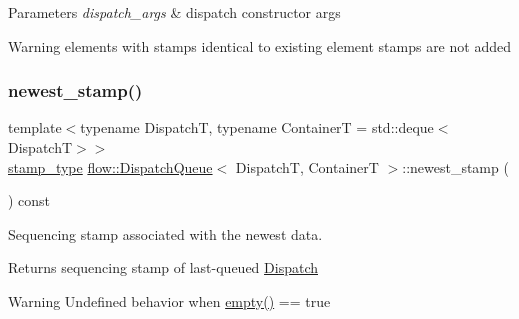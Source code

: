 \begin{DoxyParams}{Parameters}
{\em dispatch\+\_\+args} & dispatch constructor args\\
\hline
\end{DoxyParams}
\begin{DoxyWarning}{Warning}
elements with stamps identical to existing element stamps are not added 
\end{DoxyWarning}
\mbox{\label{classflow_1_1_dispatch_queue_a5ced281bc5c221a79bf88a6169429252}} 
\subsubsection{\texorpdfstring{newest\+\_\+stamp()}{newest\_stamp()}}
{\footnotesize\ttfamily template$<$typename DispatchT, typename ContainerT = std\+::deque$<$\+Dispatch\+T$>$$>$ \\
\hyperlink{classflow_1_1_dispatch_queue_a7908f3d78b7f1767462244b94434d748}{stamp\+\_\+type} \hyperlink{classflow_1_1_dispatch_queue}{flow\+::\+Dispatch\+Queue}$<$ DispatchT, ContainerT $>$\+::newest\+\_\+stamp (\begin{DoxyParamCaption}{ }\end{DoxyParamCaption}) const\hspace{0.3cm}{\ttfamily [inline]}}



Sequencing stamp associated with the newest data. 

\begin{DoxyReturn}{Returns}
sequencing stamp of last-\/queued \hyperlink{classflow_1_1_dispatch}{Dispatch}
\end{DoxyReturn}
\begin{DoxyWarning}{Warning}
Undefined behavior when {\ttfamily \hyperlink{classflow_1_1_dispatch_queue_a447412abd83540a6c595dd7a17116c6c}{empty()} == true} 
\end{DoxyWarning}
\mbox{\label{classflow_1_1_dispatch_queue_a6411ccf159a54568dc00072b35593189}} 
